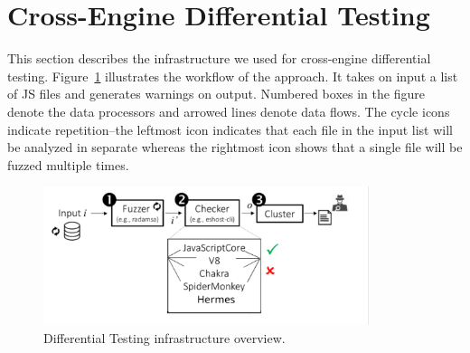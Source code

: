 \documentclass[smallextended]{svjour3}
\begin{document}





\section{Cross-Engine Differential Testing}
\label{sec:design}

This section describes the infrastructure we used for cross-engine
differential testing. Figure~\ref{fig:workflow} illustrates the
workflow of the approach. It takes on input a list of JS files and
generates warnings on output. Numbered boxes in the figure denote the
data processors and arrowed lines denote data flows. The cycle icons
indicate repetition--the leftmost icon indicates that each file in the
input list will be analyzed in separate whereas the rightmost icon
shows that a single file will be fuzzed multiple times.

\begin{figure}[t]
  \centering
  \includegraphics[trim=0 0 0 0,clip,width=0.85\textwidth]{diff-testing-runtimes}
  \caption{\label{fig:workflow}Differential Testing infrastructure overview.}
\end{figure}
\end{document}
